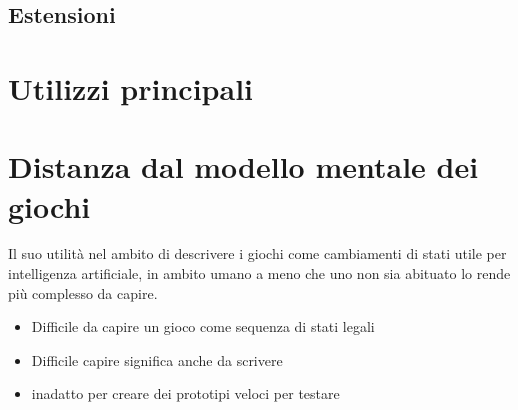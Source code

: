 
\subsection{Estensioni}

\section{Utilizzi principali}


\section{Distanza dal modello mentale dei giochi}
Il suo utilità nel ambito di descrivere i giochi come cambiamenti di stati 
utile per intelligenza artificiale, in ambito umano a meno che uno non sia 
abituato lo rende più complesso da capire. 

\begin{itemize}
    \item Difficile da capire un gioco come sequenza di stati legali
    \item Difficile capire significa anche da scrivere
    \item inadatto per creare dei prototipi veloci per testare 
\end{itemize}